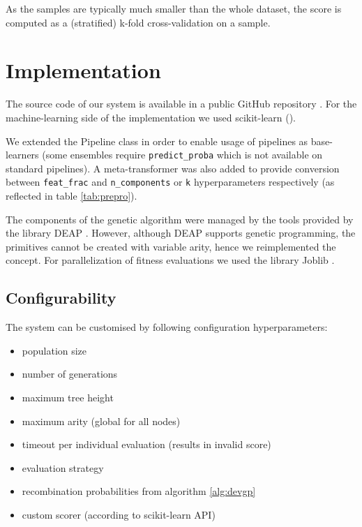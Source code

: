 As the samples are typically much smaller than the whole dataset, the score
is computed as a (stratified) k-fold cross-validation on a sample.
\section{Implementation}
The source code of our system is available in a public GitHub repository
\citep{git_genens}. %
For the machine-learning side of the implementation we used scikit-learn
(\cite{scikit-learn}).

We extended the Pipeline class in order to enable usage
of pipelines as base-learners (some ensembles require \texttt{predict\_proba}
which is not available on standard pipelines). A meta-transformer was also
added to provide conversion between \texttt{feat\_frac} and 
\texttt{n\_components} or \texttt{k} hyperparameters respectively (as reflected
in table \ref{tab:prepro}).

The components of the genetic algorithm were managed by the tools provided by
the library DEAP \citep{DEAP_JMLR2012}. However, although DEAP supports genetic
programming, the primitives cannot be created with variable arity, hence we
reimplemented the concept.
For parallelization of fitness evaluations we used the library Joblib
\citep{joblib}.


\subsection{Configurability}
The system can be customised by following configuration hyperparameters:

\begin{itemize}
\item population size
\item number of generations
\item maximum tree height
\item maximum arity (global for all nodes)
\item timeout per individual evaluation (results in invalid score)
\item evaluation strategy
\item recombination probabilities from algorithm \ref{alg:devgp}
\item custom scorer (according to scikit-learn API)
\end{itemize}



